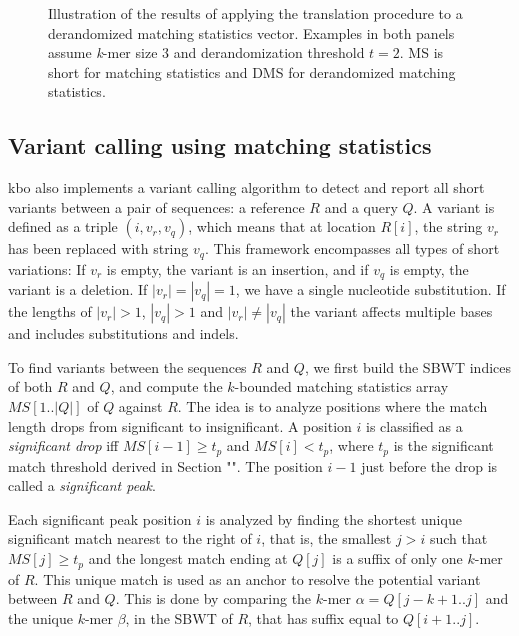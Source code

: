 \documentclass[unnumsec,webpdf,contemporary,large]{oup-authoring-template}%
\theoremstyle{thmstyleone}%
\theoremstyle{thmstyletwo}%
\theoremstyle{thmstylethree}%
\begin{document}
\begin{figure}[t]
    \centering
    
    {}
    \caption{Illustration of the results of applying the translation procedure to a derandomized matching statistics vector. Examples in both panels assume \emph{k}-mer size 3 and derandomization threshold $t=2$. MS is short for matching statistics and DMS for derandomized matching statistics.}
    \label{fig:translate_cases}
\end{figure}

\subsection{Variant calling using matching statistics}

{\sf kbo} also implements a variant calling algorithm to detect and report all short variants between a pair of sequences: a reference $R$ and  a query $Q$. A variant is defined as a triple $(i, v_r, v_q)$, which means that at location $R[i]$, the string $v_r$ has been replaced with string $v_q$. This framework encompasses all types of short variations: If $v_r$ is empty, the variant is an insertion, and if $v_q$ is empty, the variant is a deletion. If $|v_r| = |v_q| = 1$, we have a single nucleotide substitution. If the lengths of $|v_r|>1$, $|v_q|>1$ and $|v_r| \neq|v_q|$ the variant affects multiple bases and includes substitutions and indels. %

To find variants between the sequences $R$ and $Q$, we first build the SBWT indices of both $R$ and $Q$, and compute the $k$-bounded matching statistics array $MS[1..|Q|]$ of $Q$ against $R$. The idea is to analyze positions where the match length drops from significant to insignificant. A position $i$ is classified as a \emph{significant drop} iff $MS[i-1] \geq t_p$ and $MS[i] < t_p$, where $t_p$ is the significant match threshold derived in Section "". %
The position $i-1$ just before the drop is called a \emph{significant peak}.

Each significant peak position $i$ is analyzed by finding the shortest unique significant match nearest to the right of $i$, that is, the smallest $j > i$ such that $MS[j] \geq t_p$ and the longest match ending at $Q[j]$ is a suffix of only one $k$-mer of $R$. This unique match is used as an anchor to resolve the potential variant between $R$ and $Q$. This is done by comparing the $k$-mer $\alpha = Q[j-k+1..j]$ and the unique $k$-mer $\beta$, in the SBWT of $R$, that has suffix equal to $Q[i+1..j]$.
\end{document}
